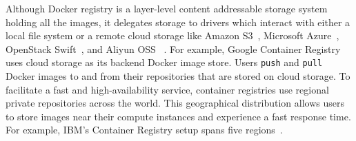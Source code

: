 Although Docker registry is a layer-level content addressable storage system holding all the images,
it delegates storage to drivers which interact with either a local file system or a remote cloud storage like Amazon S3~\cite{S3}, Microsoft Azure~\cite{azure}, OpenStack Swift~\cite{swift}, and Aliyun OSS~\cite{xxx} . 
For example, Google Container Registry~\cite{GoogleContainerRegistry} uses cloud storage as its backend Docker image store.
Users \texttt{push} and \texttt{pull} Docker images to and from their repositories that are stored on cloud storage. 
To facilitate a fast and high-availability service, container registries use regional private repositories across the world.  
This geographical distribution allows users to store images near their compute instances and experience a fast response time. 
For example, IBM's Container Registry setup spans five regions~\cite{dockerworkload}. 

%

